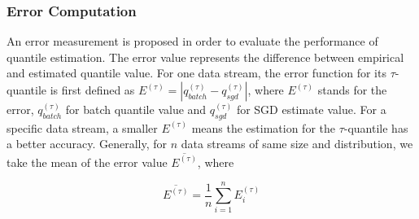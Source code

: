 \subsubsection{Error Computation}

An error measurement is proposed in order to evaluate the performance of quantile estimation. The error value represents the difference between empirical and estimated quantile value. For one data stream, the error function for its $\tau$-quantile is first defined as $E^{(\tau)} = | q_{batch}^{(\tau)} - q_{sgd}^{(\tau)} |$, where $E^{(\tau)}$ stands for the error, $q_{batch}^{(\tau)}$ for batch quantile value and $q_{sgd}^{(\tau)}$ for SGD estimate value. For a specific data stream, a smaller $E^{(\tau)}$ means the estimation for the $\tau$-quantile has a better accuracy. Generally, for $n$ data streams of same size and distribution, we take the mean of the error value $\overline{E^{(\tau)}}$, where 

    \begin{equation}
        \overline{E^{(\tau)}} = \frac{1}{n}\sum_{i=1}^{n} E^{(\tau)}_{i}
    \end{equation}
        
